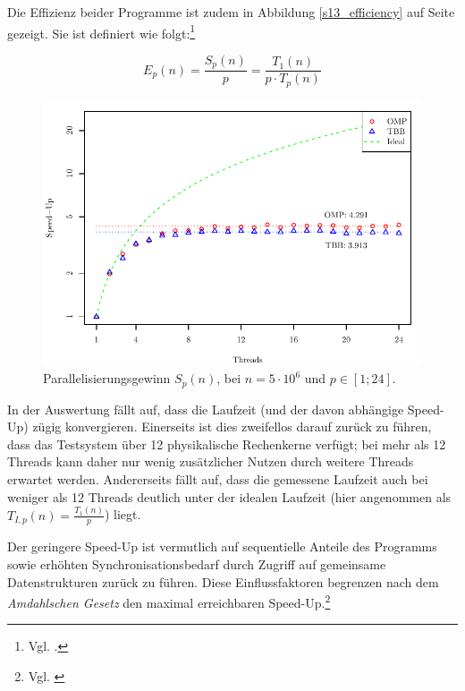 \documentclass[11pt]{scrartcl}
\begin{document}
Die Effizienz beider Programme ist zudem in Abbildung \ref{s13_efficiency} auf Seite \pageref{s13_efficiency} gezeigt. Sie ist definiert wie folgt:\footnote{Vgl. \cite[S.~164]{rauber_parallel_2010}.}

\begin{equation}
E_p(n) = \frac{S_p(n)}{p} = \frac{T_1(n)}{p \cdot T_p(n)}
\end{equation}

\begin{figure}[pbt]
\centering
\includegraphics{../messdaten/s13_speedup.pdf}
\caption{Parallelisierungsgewinn $S_p(n)$, bei $n=5\cdot 10^6$ und $p \in [1;24]$.}
\label{s13_speedup}
\end{figure}

In der Auswertung fällt auf, dass die Laufzeit (und der davon abhängige Speed-Up) zügig konvergieren. Einerseits ist dies zweifellos darauf zurück zu führen, dass das Testsystem über 12 physikalische Rechenkerne verfügt; bei mehr als 12 Threads kann daher nur wenig zusätzlicher Nutzen durch weitere Threads erwartet werden. Andererseits fällt auf, dass die gemessene Laufzeit auch bei weniger als 12 Threads deutlich unter der idealen Laufzeit (hier angenommen als $T_{I,p}(n) = \frac{T_1(n)}{p}$) liegt.

Der geringere Speed-Up ist vermutlich auf sequentielle Anteile des Programms sowie erhöhten Synchronisationsbedarf durch Zugriff auf gemeinsame Datenstrukturen zurück zu führen. Diese Einflussfaktoren begrenzen nach dem \emph{Amdahlschen Gesetz} den maximal erreichbaren Speed-Up.\footnote{Vgl. \cite[S.~318]{bengel_masterkurs_2008}}

\end{document}
